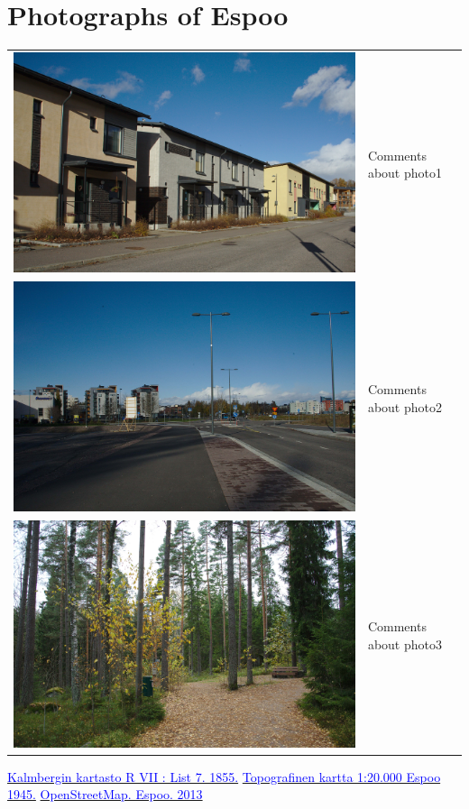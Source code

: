 \documentclass[a4paper]{article}
\newcommand{\myhref}[2]{{\href{#1}{\textcolor{blue}{#2}}}}
\newcommand{\mycity}{Espoo\xspace}
\begin{document}
\newpage

\section{Photographs of \mycity}
\begin{tabular}{lp{}}
\includegraphics[keepaspectratio,width=.5\textwidth]{traditional} & Comments about photo1\\[.2cm]
\includegraphics[keepaspectratio,width=.5\textwidth]{modern} & Comments about photo2\\[.2cm]
\includegraphics[keepaspectratio,width=.5\textwidth]{green} & Comments about photo3\\
\end{tabular}

\begin{thebibliography}{9}
 \myhref{http://www.vanhakartta.fi/historialliset-kartat/kaupunkikartat/sekalaiset-kaupunkikartat/@@mapview?handle=hdl_123456789_6888}{Kalmbergin kartasto R VII : List 7. 1855.}
 \myhref{http://koti.kapsi.fi/timomeriluoto/KARTAT/Topografiset\%20kartat/Topografinen\%20kartta\%201:20.000\%20Espoo\%201945.jpg}{Topografinen kartta 1:20.000 Espoo 1945.}
 \myhref{http://www.openstreetmap.org/\#map=14/60.2034/24.6415}{OpenStreetMap. Espoo. 2013}
\end{thebibliography}
\end{document}
